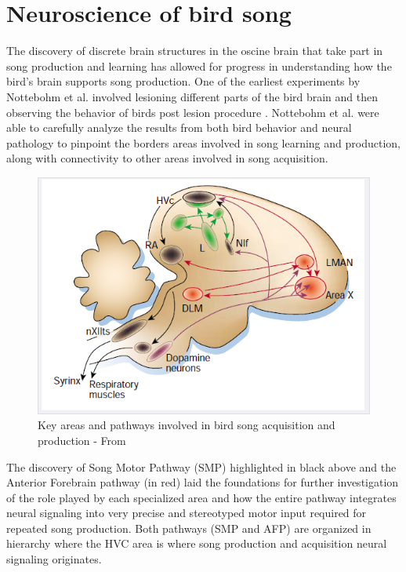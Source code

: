 \documentclass[draft,12pt,oneside]{CUNY_PhD}
\begin{document}
\chapter{Neuroscience of bird song}
The discovery of discrete brain structures in the oscine brain that take part in song production and learning has allowed for progress in understanding how the bird’s brain supports song production. One of the earliest experiments by Nottebohm et al. involved lesioning different parts of the bird brain and then observing the behavior of birds post lesion procedure \cite{12}. Nottebohm et al. were able to carefully analyze the results from both bird behavior and neural pathology to pinpoint the borders areas involved in song learning and production, along with connectivity to other areas involved in song acquisition. 
\begin{figure}[h]
\centering
\includegraphics[scale=0.3]{Map}
\caption{Key areas and pathways involved in bird song acquisition and production - From \cite{11}}\label{Fig 1}
\end{figure}
The discovery of Song Motor Pathway (SMP) highlighted in black above and the Anterior Forebrain pathway (in red) laid the foundations for further investigation of the role played by each specialized area and how the entire pathway integrates neural signaling into very precise and stereotyped motor input required for repeated song production. Both pathways (SMP and AFP) are organized in hierarchy where the HVC area is where song production and acquisition neural signaling originates.
\end{document}
